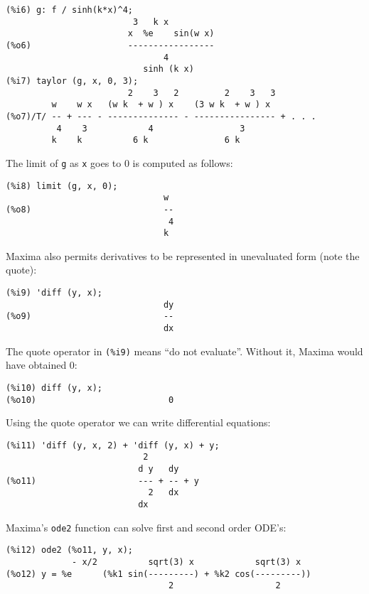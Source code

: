 \documentclass[a4paper,12pt]{article}
\begin{document}
\noindent\begin{minipage}{\textwidth}
\begin{verbatim}
(%i6) g: f / sinh(k*x)^4;
                         3   k x
                        x  %e    sin(w x)
(%o6)                   -----------------
                               4
                           sinh (k x)
(%i7) taylor (g, x, 0, 3);
                        2    3   2         2    3   3
         w    w x   (w k  + w ) x    (3 w k  + w ) x
(%o7)/T/ -- + --- - -------------- - ---------------- + . . .
          4    3            4                 3
         k    k          6 k               6 k
\end{verbatim}
\end{minipage}
The limit of {\tt g} as {\tt x} goes to 0 is computed as follows:
\begin{verbatim}
(%i8) limit (g, x, 0);
                               w
(%o8)                          --
                                4
                               k
\end{verbatim}
Maxima also permits derivatives to be represented in unevaluated form
(note the quote):
\begin{verbatim}
(%i9) 'diff (y, x);
                               dy
(%o9)                          --
                               dx
\end{verbatim}
The quote operator in {\tt (\%i9)} means ``do not evaluate''.  Without
it, Maxima would have obtained 0:
\begin{verbatim}
(%i10) diff (y, x);
(%o10)                          0
\end{verbatim}
Using the quote operator we can write differential equations:
\begin{verbatim}
(%i11) 'diff (y, x, 2) + 'diff (y, x) + y;
                           2
                          d y   dy
(%o11)                    --- + -- + y
                            2   dx
                          dx
\end{verbatim}
Maxima's {\tt ode2} function can solve first and second order ODE's:
\begin{verbatim}
(%i12) ode2 (%o11, y, x);
             - x/2          sqrt(3) x            sqrt(3) x
(%o12) y = %e      (%k1 sin(---------) + %k2 cos(---------))
                                2                    2
\end{verbatim}
\end{document}
